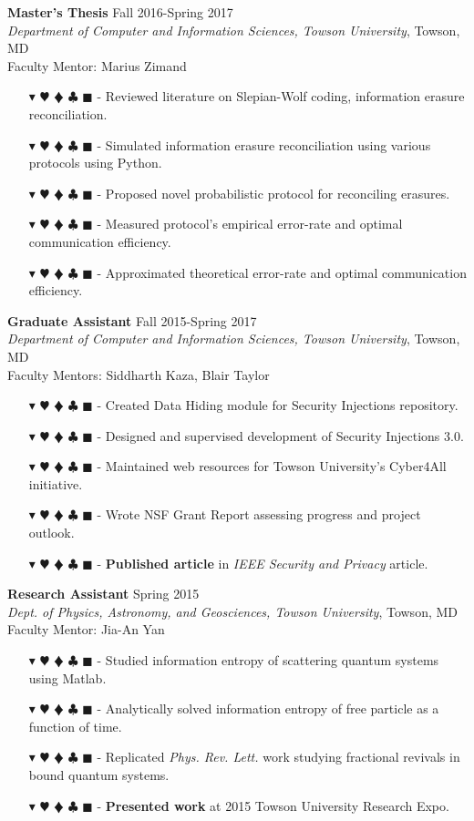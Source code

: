 \documentclass[overlapped, 10pt]{res} %
\newcommand{\physics}{$\blacktriangledown$}
\newcommand{\biochem}{$\varheartsuit$}
\newcommand{\shannon}{$\vardiamondsuit$}
\newcommand{\classic}{$\clubsuit$}
\newcommand{\quantum}{$\blacksquare$}
\newcommand{\physicscolor}{\color{YellowOrange}}
\newcommand{\biochemcolor}{\color{Emerald}}
\newcommand{\shannoncolor}{\color{Goldenrod}}
\newcommand{\classiccolor}{\color{Cyan}}
\newcommand{\quantumcolor}{\color{RedOrange}}
\newcommand{\tag}[1]{
    {\IfSubStr{#1}{\physics}{\physicscolor}{\color{White}}\physics}
    {\IfSubStr{#1}{\biochem}{\biochemcolor}{\color{White}}\biochem}
    {\IfSubStr{#1}{\shannon}{\shannoncolor}{\color{White}}\shannon}
    {\IfSubStr{#1}{\classic}{\classiccolor}{\color{White}}\classic}
    {\IfSubStr{#1}{\quantum}{\quantumcolor}{\color{White}}\quantum}
}
\begin{document}
\begin{resume}
\textbf{Master's Thesis} \hfill Fall 2016-Spring 2017 \\
\textit{Department of Computer and Information Sciences, Towson University}, Towson, MD \\
Faculty Mentor: Marius Zimand
\begin{itemize} \itemsep -2pt %
\item[\tag{\shannon}-] Reviewed literature on Slepian-Wolf coding, information erasure reconciliation.
\item[\tag{\shannon\classic}-] Simulated information erasure reconciliation using various protocols using Python.
\item[\tag{\shannon\classic}-] Proposed novel probabilistic protocol for reconciling erasures.
\item[\tag{\shannon\classic}-] Measured protocol's empirical error-rate and optimal communication efficiency.
\item[\tag{\shannon}-] Approximated theoretical error-rate and optimal communication efficiency.
\end{itemize}

\textbf{Graduate Assistant} \hfill Fall 2015-Spring 2017 \\
\textit{Department of Computer and Information Sciences, Towson University}, Towson, MD \\
Faculty Mentors: Siddharth Kaza, Blair Taylor
\begin{itemize} \itemsep -2pt %
\item[\tag{\classic}-] Created Data Hiding module for Security Injections repository.
\item[\tag{\classic}-] Designed and supervised development of Security Injections 3.0.
\item[\tag{\classic}-] Maintained web resources for Towson University's Cyber4All initiative.
\item[\tag{}-] Wrote NSF Grant Report assessing progress and project outlook.
\item[\tag{}-] \textbf{Published article} in \textit{IEEE Security and Privacy} article.
\end{itemize}

\textbf{Research Assistant} \hfill Spring 2015 \\
\textit{Dept. of Physics, Astronomy, and Geosciences, Towson University}, Towson, MD \\
Faculty Mentor: Jia-An Yan
\begin{itemize} \itemsep -2pt %
\item[\tag{\physics\shannon\classic}-] Studied information entropy of scattering quantum systems using Matlab.
\item[\tag{\physics\shannon}-] Analytically solved information entropy of free particle as a function of time.
\item[\tag{\physics\shannon\classic}-] Replicated \textit{Phys. Rev. Lett.} work studying fractional revivals in bound quantum systems.
\item[\tag{}-] \textbf{Presented work} at 2015 Towson University Research Expo.
\end{itemize}


\end{resume}
\end{document}
